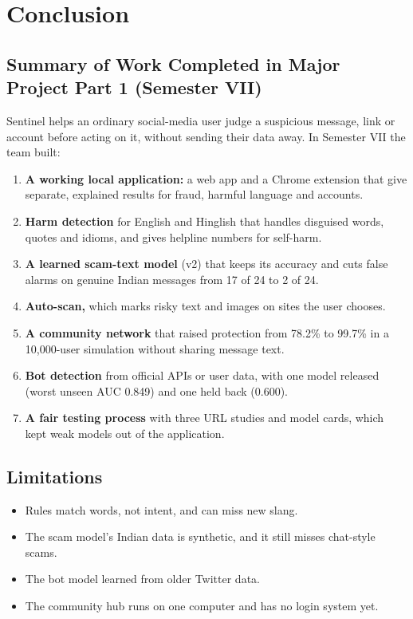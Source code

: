 \onehalfspacing
\pagestyle{fancy}
\fancyhf{}
\renewcommand{\headrulewidth}{0pt}
\cfoot{\thepage}
\chapter{Conclusion}

\section{Summary of Work Completed in Major Project Part 1 (Semester VII)}
\noindent Sentinel helps an ordinary social-media user judge a suspicious message, link or account before acting on it, without sending their data away. In Semester VII the team built:
\begin{enumerate}
\item \textbf{A working local application:} a web app and a Chrome extension that give separate, explained results for fraud, harmful language and accounts.
\item \textbf{Harm detection} for English and Hinglish that handles disguised words, quotes and idioms, and gives helpline numbers for self-harm.
\item \textbf{A learned scam-text model} (v2) that keeps its accuracy and cuts false alarms on genuine Indian messages from 17 of 24 to 2 of 24.
\item \textbf{Auto-scan,} which marks risky text and images on sites the user chooses.
\item \textbf{A community network} that raised protection from 78.2\% to 99.7\% in a 10,000-user simulation without sharing message text.
\item \textbf{Bot detection} from official APIs or user data, with one model released (worst unseen AUC 0.849) and one held back (0.600).
\item \textbf{A fair testing process} with three URL studies and model cards, which kept weak models out of the application.
\end{enumerate}

\section{Limitations}
\begin{itemize}
\item Rules match words, not intent, and can miss new slang.
\item The scam model's Indian data is synthetic, and it still misses chat-style scams.
\item The bot model learned from older Twitter data.
\item The community hub runs on one computer and has no login system yet.
\end{itemize}


